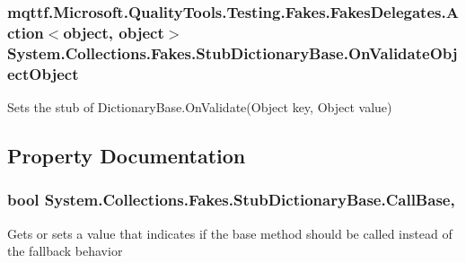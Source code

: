 \hypertarget{class_system_1_1_collections_1_1_fakes_1_1_stub_dictionary_base_aafe1f72a6bacd53fbf1b1ddbd397ed85}{
\subsubsection[{On\-Validate\-Object\-Object}]{\setlength{\rightskip}{0pt plus 5cm}mqttf.\-Microsoft.\-Quality\-Tools.\-Testing.\-Fakes.\-Fakes\-Delegates.\-Action$<$object, object$>$ System.\-Collections.\-Fakes.\-Stub\-Dictionary\-Base.\-On\-Validate\-Object\-Object}}\label{class_system_1_1_collections_1_1_fakes_1_1_stub_dictionary_base_aafe1f72a6bacd53fbf1b1ddbd397ed85}


Sets the stub of Dictionary\-Base.\-On\-Validate(\-Object key, Object value)



\subsection{Property Documentation}
\hypertarget{class_system_1_1_collections_1_1_fakes_1_1_stub_dictionary_base_ac8b7bd11aa5e8d6a69015294feea2442}{
\subsubsection[{Call\-Base}]{\setlength{\rightskip}{0pt plus 5cm}bool System.\-Collections.\-Fakes.\-Stub\-Dictionary\-Base.\-Call\-Base\hspace{0.3cm}{\ttfamily [get]}, {\ttfamily [set]}}}\label{class_system_1_1_collections_1_1_fakes_1_1_stub_dictionary_base_ac8b7bd11aa5e8d6a69015294feea2442}


Gets or sets a value that indicates if the base method should be called instead of the fallback behavior

